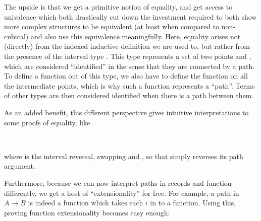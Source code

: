 \documentclass[../Main.tex]{subfiles}
\begin{document}
The upside is that we get a primitive notion of equality, and get access to univalence which both drastically cut down the investment required to both show more complex structures to be equivalent (at least when compared to non-cubical) and also use this equivalence meaningfully. Here, equality arises not (directly) from the indexed inductive definition we are used to, but rather from the presence of the interval type . This type represents a set of two points  and , which are considered ``identified'' in the sense that they are connected by a path. To define a function out of this type, we also have to define the function on all the intermediate points, which is why such a function represents a ``path''. Terms of other types are then considered identified when there is a path between them.

As an added benefit, this different perspective gives intuitive interpretations to some proofs of equality, like
\begin{code}%
\>[0]\AgdaSpace{}%
\AgdaSymbol{:}\AgdaSpace{}%
\AgdaSpace{}%
\AgdaSpace{}%
\AgdaSpace{}%
\AgdaSpace{}%
\AgdaSpace{}%
\AgdaSpace{}%
\<%
\\
\>[0]\AgdaSpace{}%
\AgdaSpace{}%
\AgdaSpace{}%
\AgdaSymbol{=}\AgdaSpace{}%
\AgdaSpace{}%
\AgdaSymbol{(}\AgdaOperator{\AgdaPrimitive{\textasciitilde{}}}\AgdaSpace{}%
\AgdaSymbol{)}\<%
\end{code}
where  is the interval reversal, swapping  and , so that  simply reverses its path argument.

Furthermore, because we can now interpret paths in records and function differently, we get a host of ``extensionality'' for free. For example, a path in $A \to B$ is indeed a function which takes each $i$ in  to a function. Using this, proving function extensionality becomes easy enough: 
\begin{code}%
\>[0]\AgdaSpace{}%
\AgdaSymbol{:}\AgdaSpace{}%
\AgdaSpace{}%
\AgdaSpace{}%
\AgdaSpace{}%
\AgdaSpace{}%
\AgdaSpace{}%
\AgdaSpace{}%
\AgdaSpace{}%
\AgdaSymbol{)}\AgdaSpace{}%
\AgdaSpace{}%
\AgdaSpace{}%
\AgdaSpace{}%
\<%
\\
\>[0]\AgdaSpace{}%
\AgdaSpace{}%
\AgdaSpace{}%
\AgdaSpace{}%
\AgdaSymbol{=}\AgdaSpace{}%
\AgdaSpace{}%
\AgdaSpace{}%
\<%
\end{code}
\end{document}

